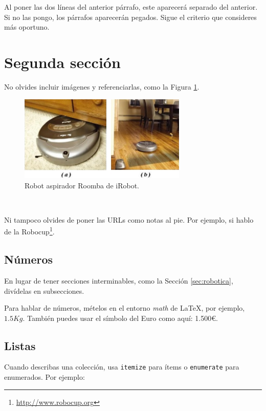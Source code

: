 			Al poner las dos líneas del anterior párrafo, este aparecerá separado del anterior. Si no las pongo, los párrafos aparecerán pegados. Sigue el criterio que consideres más oportuno.
			
			\section{Segunda sección}
			\label{sec:segundaseccion}
			
			No olvides incluir imágenes y referenciarlas, como la Figura \ref{fig:roomba}.
			
			\begin{figure} [h!]
				\begin{center}
					\includegraphics[width=8cm]{figs/roomba}
				\end{center}
				\caption{Robot aspirador Roomba de iRobot.}
				\label{fig:roomba}
			\end{figure}\
			
			Ni tampoco olvides de poner las URLs como notas al pie. Por ejemplo, si hablo de la Robocup\footnote{\url{http://www.robocup.org}}.
			
			\subsection{Números}
			\label{sec:subseccion}
			
			En lugar de tener secciones interminables, como la Sección \ref{sec:robotica}, divídelas en subsecciones.
			
			Para hablar de números, mételos en el entorno \textit{math} de \LaTeX, por ejemplo, $1.5Kg$. También puedes usar el símbolo del Euro como aquí: 1.500\euro.
			
			\subsection{Listas}
			
			Cuando describas una colección, usa \texttt{itemize} para ítems o \texttt{enumerate} para enumerados. Por ejemplo:
			
